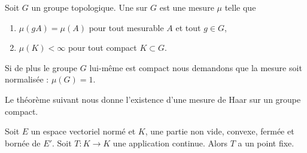 \begin{definition}
    Soit \( G\) un groupe topologique. Une  sur \( G\) est une mesure \( \mu\) telle que 
    \begin{enumerate}
        \item
            \( \mu(gA)=\mu(A)\) pour tout mesurable \( A\) et tout \( g\in G\),
        \item
            \( \mu(K)<\infty\) pour tout compact \( K\subset G\).
    \end{enumerate}
    Si de plus le groupe \( G\) lui-même est compact nous demandons que la mesure soit normalisée : \( \mu(G)=1\).
\end{definition}

Le théorème suivant nous donne l'existence d'une mesure de Haar sur un groupe compact.
\begin{theorem}   \label{ThoeJCdMP}
    Soit \( E\) un espace vectoriel normé et \( K\), une partie non vide, convexe, fermée et bornée de \( E'\). Soit \( T\colon K\to K\) une application continue. Alors \( T\) a un point fixe.
\end{theorem}


